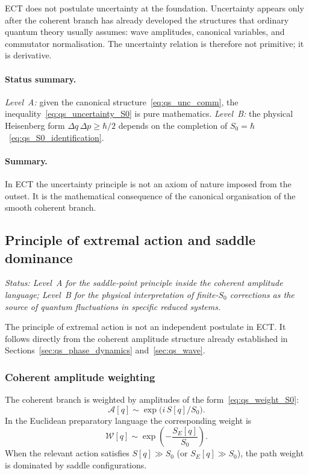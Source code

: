ECT does not postulate uncertainty at the foundation.
Uncertainty appears only after the coherent branch has already
developed the structures that ordinary quantum theory usually assumes:
wave amplitudes, canonical variables, and commutator normalisation.
The uncertainty relation is therefore not primitive; it is derivative.

\paragraph{Status summary.}
\textit{Level~A:} given the canonical structure~\eqref{eq:qs_unc_comm},
the inequality~\eqref{eq:qs_uncertainty_S0} is pure mathematics.
\textit{Level~B:} the physical Heisenberg form
$\Delta q\,\Delta p\ge\hbar/2$ depends on the completion of
$S_0=\hbar$~\eqref{eq:qs_S0_identification}.

\paragraph{Summary.}
In ECT the uncertainty principle is not an axiom of nature imposed from
the outset.
It is the mathematical consequence of the canonical organisation of the
smooth coherent branch.

\subsection{Principle of extremal action and saddle dominance}
\label{sec:qs_extremal_action}

\textit{Status: Level~A for the saddle-point principle inside the
coherent amplitude language; Level~B for the physical interpretation
of finite-$S_0$ corrections as the source of quantum fluctuations in
specific reduced systems.}

\medskip
The principle of extremal action is not an independent postulate in
ECT.
It follows directly from the coherent amplitude structure already
established in Sections~\ref{sec:qs_phase_dynamics}
and~\ref{sec:qs_wave}.

\subsubsection*{Coherent amplitude weighting}

The coherent branch is weighted by amplitudes of the
form~\eqref{eq:qs_weight_S0}:
\[
  \mathcal{A}[q] \sim \exp\!\bigl(i\,S[q]/S_0\bigr).
\]
In the Euclidean preparatory language the corresponding weight is
\begin{equation}
  \label{eq:qs_extremal_weight_E}
  \mathcal{W}[q]
  \sim
  \exp\!\left(-\frac{S_E[q]}{S_0}\right).
\end{equation}
When the relevant action satisfies $S[q]\gg S_0$ (or $S_E[q]\gg S_0$),
the path weight is dominated by saddle configurations.

